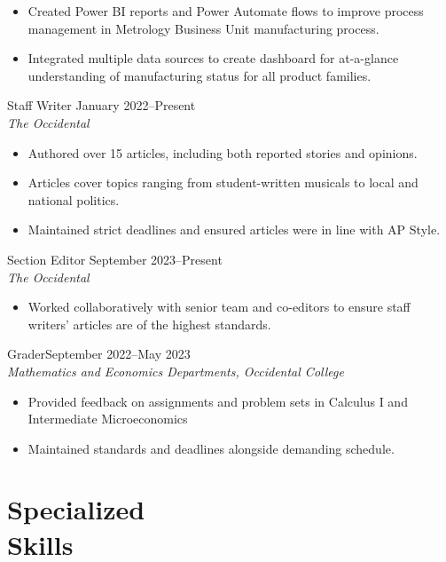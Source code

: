 \documentclass[margin, 10pt]{res} %
\begin{document}
\begin{resume}
\begin{itemize} \itemsep -2pt %
\item Created Power BI reports and Power Automate flows to improve process management in Metrology Business Unit manufacturing process.
\item Integrated multiple data sources to create dashboard for at-a-glance understanding of manufacturing status for all product families.
\end{itemize}
 
Staff Writer \hfill January 2022--Present \\
\textit{The Occidental} 
\begin{itemize} \itemsep -2pt
\item Authored over 15 articles, including both reported stories and opinions.
\item Articles cover topics ranging from student-written musicals to local and national politics.
\item Maintained strict deadlines and ensured articles were in line with AP Style.
\end{itemize} 

Section Editor \hfill September 2023--Present \\
\textit{The Occidental}
\begin{itemize}\itemsep -2pt
  \item Worked collaboratively with senior team and co-editors to ensure staff writers' articles are of the highest standards.
\end{itemize} 

Grader\hfill September 2022--May 2023\\
\textit{Mathematics and Economics Departments, Occidental College}
\begin{itemize}\itemsep -2pt
  \item Provided feedback on assignments and problem sets in Calculus I and Intermediate Microeconomics
  \item Maintained standards and deadlines alongside demanding schedule.
\end{itemize}


\section{\sc Specialized \\ Skills} 


\end{resume}
\end{document}
